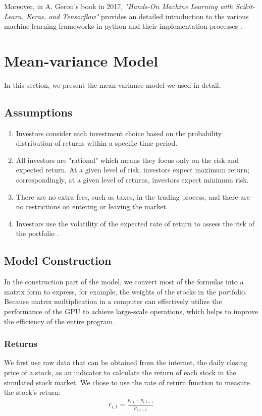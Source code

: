\documentclass[default,iicol]{sn-jnl}%
\begin{document}
Moreover, in A. Geron's book in 2017, \textit{"Hands-On Machine Learning with Scikit-Learn, Keras, and Tensorflow"} provides an detailed introduction to the various machine learning frameworks in python and their implementation processes \cite{Aur2017Hands}.

\section{Mean-variance Model}\label{sec3}

In this section, we present the mean-variance model we used in detail.

\subsection{Assumptions}\label{sec3sub1}
\begin{enumerate}
    \item Investors consider each investment choice based on the probability distribution of returns within a specific time period.
    \item All investors are "rational" which means they focus only on the  risk and expected return. At a given level of risk, investors expect maximum return; correspondingly, at a given level of returns, investors expect minimum risk.
    \item There are no extra fees, such as taxes, in the trading process, and there are no restrictions on entering or leaving the market.
    \item Investors use the volatility of the expected rate of return to assess the risk of the portfolio \cite{2019Application}.
\end{enumerate}

\subsection{Model Construction}\label{sec3sub2} 
In the construction part of the model, we convert most of the formulas into a matrix form to express, for example, the weights of the stocks in the portfolio. Because matrix multiplication in a computer can effectively utilize the performance of the GPU to achieve large-scale operations, which helps to improve the efficiency of the entire program.
\subsubsection{Returns}\label{sec3sub2ssub1}
\hspace{1.5em}We first use raw data that can be obtained from the internet, the daily closing price of a stock, as an indicator to calculate the return of each stock in the simulated stock market. We chose to use the rate of return function to measure the stock's return:
\begin{align}
	r_{i,t}=\frac{p_{i,t}-p_{i,t-1}}{p_{i,t-1}}
	\label{eq1}
\end{align}
\end{document}
